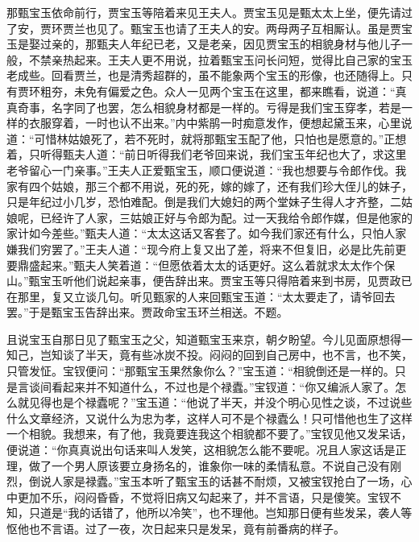 \begin{parag}
    那甄宝玉依命前行，贾宝玉等陪着来见王夫人。贾宝玉见是甄太太上坐，便先请过了安，贾环贾兰也见了。甄宝玉也请了王夫人的安。两母两子互相厮认。虽是贾宝玉是娶过亲的，那甄夫人年纪已老，又是老亲，因见贾宝玉的相貌身材与他儿子一般，不禁亲热起来。王夫人更不用说，拉着甄宝玉问长问短，觉得比自己家的宝玉老成些。回看贾兰，也是清秀超群的，虽不能象两个宝玉的形像，也还随得上。只有贾环粗夯，未免有偏爱之色。众人一见两个宝玉在这里，都来瞧看，说道：“真真奇事，名字同了也罢，怎么相貌身材都是一样的。亏得是我们宝玉穿孝，若是一样的衣服穿着，一时也认不出来。”内中紫鹃一时痴意发作，便想起黛玉来，心里说道：“可惜林姑娘死了，若不死时，就将那甄宝玉配了他，只怕也是愿意的。”正想着，只听得甄夫人道：“前日听得我们老爷回来说，我们宝玉年纪也大了，求这里老爷留心一门亲事。”王夫人正爱甄宝玉，顺口便说道：“我也想要与令郎作伐。我家有四个姑娘，那三个都不用说，死的死，嫁的嫁了，还有我们珍大侄儿的妹子，只是年纪过小几岁，恐怕难配。倒是我们大媳妇的两个堂妹子生得人才齐整，二姑娘呢，已经许了人家，三姑娘正好与令郎为配。过一天我给令郎作媒，但是他家的家计如今差些。”甄夫人道：“太太这话又客套了。如今我们家还有什么，只怕人家嫌我们穷罢了。”王夫人道：“现今府上复又出了差，将来不但复旧，必是比先前更要鼎盛起来。”甄夫人笑着道：“但愿依着太太的话更好。这么着就求太太作个保山。”甄宝玉听他们说起亲事，便告辞出来。贾宝玉等只得陪着来到书房，见贾政已在那里，复又立谈几句。听见甄家的人来回甄宝玉道：“太太要走了，请爷回去罢。”于是甄宝玉告辞出来。贾政命宝玉环兰相送。不题。
\end{parag}


\begin{parag}
    且说宝玉自那日见了甄宝玉之父，知道甄宝玉来京，朝夕盼望。今儿见面原想得一知己，岂知谈了半天，竟有些冰炭不投。闷闷的回到自己房中，也不言，也不笑，只管发怔。宝钗便问：“那甄宝玉果然象你么？”宝玉道：“相貌倒还是一样的。只是言谈间看起来并不知道什么，不过也是个禄蠹。”宝钗道：“你又编派人家了。怎么就见得也是个禄蠹呢？”宝玉道：“他说了半天，并没个明心见性之谈，不过说些什么文章经济，又说什么为忠为孝，这样人可不是个禄蠹么！只可惜他也生了这样一个相貌。我想来，有了他，我竟要连我这个相貌都不要了。”宝钗见他又发呆话，便说道：“你真真说出句话来叫人发笑，这相貌怎么能不要呢。况且人家这话是正理，做了一个男人原该要立身扬名的，谁象你一味的柔情私意。不说自己没有刚烈，倒说人家是禄蠹。”宝玉本听了甄宝玉的话甚不耐烦，又被宝钗抢白了一场，心中更加不乐，闷闷昏昏，不觉将旧病又勾起来了，并不言语，只是傻笑。宝钗不知，只道是“我的话错了，他所以冷笑”，也不理他。岂知那日便有些发呆，袭人等怄他也不言语。过了一夜，次日起来只是发呆，竟有前番病的样子。
\end{parag}


